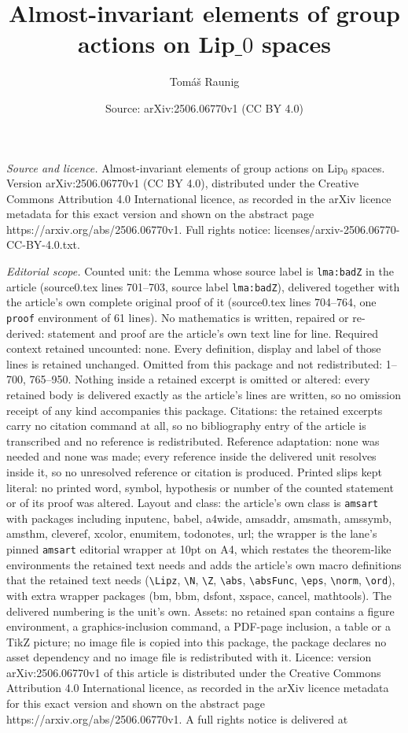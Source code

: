 \documentclass[10pt,a4paper]{amsart}
\title[Almost-invariant elements of group actions on Lip$\_0$ spaces]{Almost-invariant elements of group actions on Lip$\_0$ spaces}
\author{Tom\'a\v{s} Raunig}
\date{Source: arXiv:2506.06770v1 (CC BY 4.0)}
\begin{document}
\maketitle

\noindent\emph{Source and licence.} Almost-invariant elements of group actions on Lip$_0$ spaces. Version arXiv:2506.06770v1 (CC BY 4.0), distributed under the Creative Commons Attribution 4.0 International licence, as recorded in the arXiv licence metadata for this exact version and shown on the abstract page https://arxiv.org/abs/2506.06770v1. Full rights notice: licenses/arxiv-2506.06770-CC-BY-4.0.txt.\par\smallskip

\noindent\textit{Editorial scope.} Counted unit: the Lemma whose source label is \texttt{lma:badZ} in the article (source0.tex lines 701--703, source label \texttt{lma:badZ}), delivered together with the article's own complete original proof of it (source0.tex lines 704--764, one \texttt{proof} environment of 61 lines). No mathematics is written, repaired or re-derived: statement and proof are the article's own text line for line. Required context retained uncounted: none. Every definition, display and label of those lines is retained unchanged. Omitted from this package and not redistributed: 1--700, 765--950. Nothing inside a retained excerpt is omitted or altered: every retained body is delivered exactly as the article's lines are written, so no omission receipt of any kind accompanies this package. Citations: the retained excerpts carry no citation command at all, so no bibliography entry of the article is transcribed and no reference is redistributed. Reference adaptation: none was needed and none was made; every reference inside the delivered unit resolves inside it, so no unresolved reference or citation is produced. Printed slips kept literal: no printed word, symbol, hypothesis or number of the counted statement or of its proof was altered. Layout and class: the article's own class is \texttt{amsart} with packages including inputenc, babel, a4wide, amsaddr, amsmath, amssymb, amsthm, cleveref, xcolor, enumitem, todonotes, url; the wrapper is the lane's pinned \texttt{amsart} editorial wrapper at 10pt on A4, which restates the theorem-like environments the retained text needs and adds the article's own macro definitions that the retained text needs (\texttt{\textbackslash Lipz}, \texttt{\textbackslash N}, \texttt{\textbackslash Z}, \texttt{\textbackslash abs}, \texttt{\textbackslash absFunc}, \texttt{\textbackslash eps}, \texttt{\textbackslash norm}, \texttt{\textbackslash ord}), with extra wrapper packages (bm, bbm, dsfont, xspace, cancel, mathtools). The delivered numbering is the unit's own. Assets: no retained span contains a figure environment, a graphics-inclusion command, a PDF-page inclusion, a table or a TikZ picture; no image file is copied into this package, the package declares no asset dependency and no image file is redistributed with it. Licence: version arXiv:2506.06770v1 of this article is distributed under the Creative Commons Attribution 4.0 International licence, as recorded in the arXiv licence metadata for this exact version and shown on the abstract page https://arxiv.org/abs/2506.06770v1. A full rights notice is delivered at 
\end{document}
